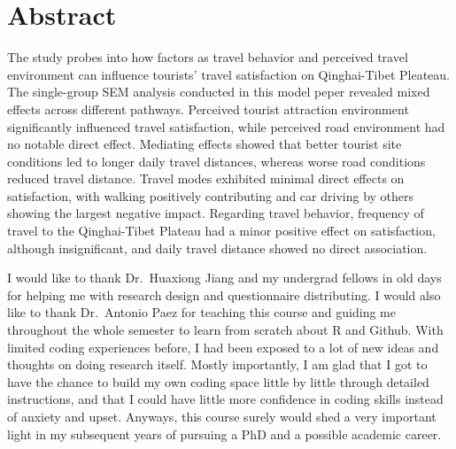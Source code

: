 \documentclass[
11pt, %
oneside, %
english, %
singlespacing, %
]{macthesis} %
\def\blankpage{%
      \clearpage%
      \thispagestyle{empty}%
      \addtocounter{page}{-1}%
      \null%
      \clearpage}
\begin{document}

\section*{\Huge Abstract}
\addchaptertocentry{\abstractname}
The study probes into how factors as travel behavior and perceived travel environment can influence tourists' travel satisfaction on Qinghai-Tibet Pleateau. The single-group SEM analysis conducted in this model peper revealed mixed effects across different pathways. Perceived tourist attraction environment significantly influenced travel satisfaction, while perceived road environment had no notable direct effect. Mediating effects showed that better tourist site conditions led to longer daily travel distances, whereas worse road conditions reduced travel distance. Travel modes exhibited minimal direct effects on satisfaction, with walking positively contributing and car driving by others showing the largest negative impact. Regarding travel behavior, frequency of travel to the Qinghai-Tibet Plateau had a minor positive effect on satisfaction, although insignificant, and daily travel distance showed no direct association.
\blankpage
\clearpage


  \begin{acknowledgements}
  \addchaptertocentry{\acknowledgementname} %
    I would like to thank Dr.~Huaxiong Jiang and my undergrad fellows in old days for helping me with research design and questionnaire distributing. I would also like to thank Dr.~Antonio Paez for teaching this course and guiding me throughout the whole semester to learn from scratch about R and Github. With limited coding experiences before, I had been exposed to a lot of new ideas and thoughts on doing research itself. Mostly importantly, I am glad that I got to have the chance to build my own coding space little by little through detailed instructions, and that I could have little more confidence in coding skills instead of anxiety and upset. Anyways, this course surely would shed a very important light in my subsequent years of pursuing a PhD and a possible academic career.
  \end{acknowledgements}
\blankpage
\clearpage
\end{document}
